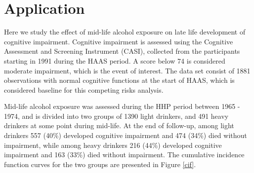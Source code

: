 \documentclass[11pt]{article}
\begin{document}
\section{Application}\label{application}


Here we study the effect of mid-life alcohol exposure on late life development of %
cognitive impairment. Cognitive impairment is assessed using the  Cognitive Assessment and Screening Instrument (CASI), collected from the participants starting in 1991 during the HAAS period. A score below 74 is considered moderate impairment, which is the event of interest. 
The data set consist of 1881 observations with normal cognitive functions at the start of HAAS, which is considered baseline for this competing risks analysis. 

Mid-life alcohol exposure was assessed during the HHP period between 1965 - 1974,  
and is divided into two groups of 1390  light drinkers, and 491  heavy drinkers at some point during mid-life.
At the end of follow-up, 
among light drinkers  557 (40\%) developed cognitive impairment and 474 (34\%) died without impairment, while among heavy drinkers %
216 (44\%) developed cognitive impairment and 163 (33\%) died without impairment. 
The cumulative incidence function curves for the two groups are presented in Figure \ref{cif}.
\end{document}
